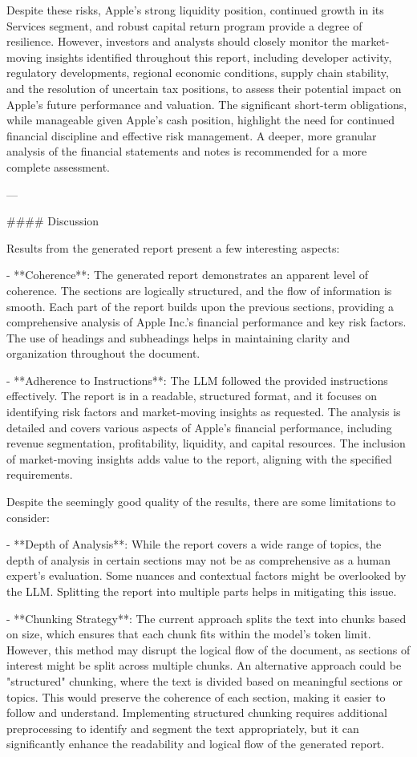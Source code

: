 {{Despite these risks, Apple's strong liquidity position, continued growth in its Services segment, and robust capital return program provide a degree of resilience.  However, investors and analysts should closely monitor the market-moving insights identified throughout this report, including developer activity, regulatory developments, regional economic conditions, supply chain stability, and the resolution of uncertain tax positions, to assess their potential impact on Apple's future performance and valuation.  The significant short-term obligations, while manageable given Apple's cash position, highlight the need for continued financial discipline and effective risk management.  A deeper, more granular analysis of the financial statements and notes is recommended for a more complete assessment.


---

#### Discussion

Results from the generated report present a few interesting aspects:

- **Coherence**: The generated report demonstrates an apparent level of coherence. The sections are logically structured, and the flow of information is smooth. Each part of the report builds upon the previous sections, providing a comprehensive analysis of Apple Inc.'s financial performance and key risk factors. The use of headings and subheadings helps in maintaining clarity and organization throughout the document.

- **Adherence to Instructions**: The LLM followed the provided instructions effectively. The report is in a readable, structured format, and it focuses on identifying risk factors and market-moving insights as requested. The analysis is detailed and covers various aspects of Apple's financial performance, including revenue segmentation, profitability, liquidity, and capital resources. The inclusion of market-moving insights adds value to the report, aligning with the specified requirements.

Despite the seemingly good quality of the results, there are some limitations to consider:

- **Depth of Analysis**: While the report covers a wide range of topics, the depth of analysis in certain sections may not be as comprehensive as a human expert's evaluation. Some nuances and contextual factors might be overlooked by the LLM. Splitting the report into multiple parts helps in mitigating this issue.

- **Chunking Strategy**: The current approach splits the text into chunks based on size, which ensures that each chunk fits within the model's token limit. However, this method may disrupt the logical flow of the document, as sections of interest might be split across multiple chunks. An alternative approach could be "structured" chunking, where the text is divided based on meaningful sections or topics. This would preserve the coherence of each section, making it easier to follow and understand. Implementing structured chunking requires additional preprocessing to identify and segment the text appropriately, but it can significantly enhance the readability and logical flow of the generated report.

}}
